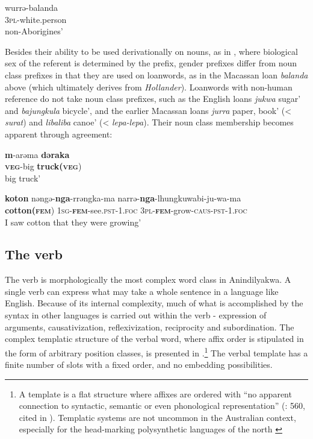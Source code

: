 \documentclass[output=paper]{langscibook}
\begin{document}
\ex 
\label{ex:vanegmond:4c}
\gll wurrə-balanda\\
 \textsc{3pl}-white.person\\
\glt non-Aborigines’
\z
\z



Besides their ability to be used derivationally on nouns, as in , where biological sex of the referent is determined by the prefix, gender prefixes differ from noun class prefixes in that they are used on loanwords, as in the Macassan loan \textit{balanda} above (which ultimately derives from \textit{Hollander}). Loanwords with non-human reference do not take noun class prefixes, such as the English loans \textit{jukwa} sugar’ and \textit{bajungkula} bicycle’, and the earlier Macassan loans \textit{jurra} paper, book’ (< \textit{surat}) and \textit{libaliba} canoe’ (< \textit{lepa-lepa}). Their noun class membership becomes apparent through agreement:



\ea%
 \label{ex:vanegmond:5}

\ea
\label{ex:vanegmond:5a}
\gll \textbf{m}{-arəma} \textbf{{dəraka}}\\
\textbf{\textsc{veg}}-big \textbf{truck(\textsc{veg}})\\
\glt big truck’

 \ex
 \label{ex:vanegmond:5b}
\gll \textbf{{koton}} {nəngə-}\textbf{{nga}}{-rrəngka-ma} narrə-\textbf{{nga}}{-lhungkuwabi-ju-wa-ma}\\
\textbf{cotton(\textsc{fem}}) \textsc{1sg-}\textbf{\textsc{fem}}-see.\textsc{pst}-1.\textsc{foc} \textsc{3pl-}\textbf{\textsc{fem}}-grow-\textsc{caus}-\textsc{pst}-1.\textsc{foc}\\
\glt I saw cotton that they were growing’
\z
\z


\subsection{The verb}
\label{sec:vanegmond:2.3}

The verb is morphologically the most complex word class in Anindilyakwa. A single verb can express what may take a whole sentence in a language like English. Because of its internal complexity, much of what is accomplished by the syntax in other languages is carried out within the verb - expression of arguments, causativization, reflexivization, reciprocity and subordination. The complex templatic structure of the verbal word, where affix order is stipulated in the form of arbitrary position classes, is presented in .\footnote{A template is a flat structure where affixes are ordered with “no apparent connection to syntactic, semantic or even phonological representation” (\citealt{Inkelas1993}: 560, cited in \citealt{Nordlinger2010}). Templatic systems are not uncommon in the Australian context, especially for the head-marking polysynthetic languages of the north \citep{Nordlinger2010}} The verbal template has a finite number of slots with a fixed order, and no embedding possibilities.
\end{document}
